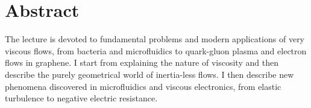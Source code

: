 	\section*{Abstract} %
	The lecture is devoted to fundamental problems and modern applications of very viscous flows, from bacteria and microfluidics to quark-gluon plasma and electron flows in graphene. I start from explaining the nature of viscosity and then describe the purely geometrical world of inertia-less flows. I then describe new phenomena discovered in microfluidics and viscous electronics, from elastic turbulence to negative electric resistance.
	
         
    \vspace{.5cm}
    \newpage
    
